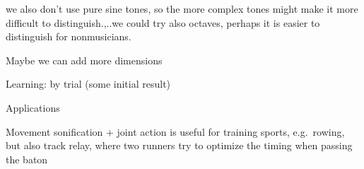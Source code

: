 \documentclass[10pt,a4paper,onecolumn]{article}
\begin{document}
we also don't use pure sine tones, so the more complex tones might make it more difficult to distinguish.,..we could try also octaves, perhaps it is easier to distinguish for nonmusicians.

Maybe we can add more dimensions

Learning: by trial (some initial result)

Applications

Movement sonification + joint action is useful for training sports, e.g.~rowing, but also track relay, where two runners try to optimize the timing when passing the baton
\balance
\clearpage


\printbibliography[title=References,heading=bibintoc]
\end{document}
